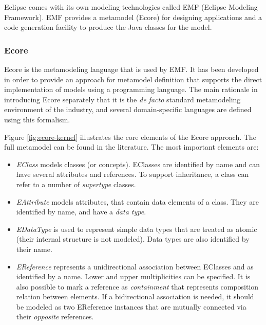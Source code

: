 Eclipse comes with its own modeling technologies called EMF (Eclipse Modeling Framework). EMF provides a metamodel (Ecore) for designing applications and a code generation facility to produce the Java classes for the model.

\subsubsection{Ecore}
\label{ecore}


Ecore is the metamodeling language that is used by EMF. It has been developed in order to provide an approach
for metamodel definition that supports the direct implementation of models using a programming language. 
The main rationale in introducing Ecore separately that it is the \emph{de facto}
standard metamodeling environment of the industry, and several domain-specific
languages are defined using this formalism.

 
 
Figure \ref{fig:ecore-kernel} illustrates the core elements of the Ecore approach. The full metamodel can be found in the literature. The most important elements are:

\begin{itemize}
  \item \emph{EClass} models classes (or concepts). EClasses are identified by
  name and can have several attributes and references. To support inheritance,
  a class can refer to a number of \emph{supertype} classes.
  \item \emph{EAttribute} models attributes, that contain data elements of a
  class. They are identified by name, and have a \emph{data type}.
  \item \emph{EDataType} is used to represent simple data types that are
  treated as atomic (their internal structure is not modeled). Data types are
  also identified by their name.
  \item \emph{EReference} represents a unidirectional association between
  EClasses and as identified by a name. Lower and upper multiplicities can be 
  specified. It is also possible to mark a reference as \emph{containment} that
  represents composition relation between elements. If a bidirectional
  association is needed, it should be modeled as two EReference instances
  that are mutually connected via their \emph{opposite} references.
\end{itemize}

